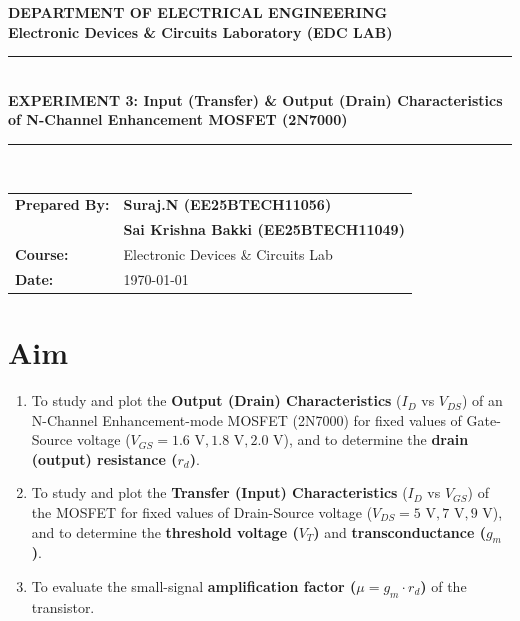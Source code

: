 \documentclass[11pt,a4paper]{article}
\begin{document}
\begin{center}
    {\LARGE \textbf{\color{primary} DEPARTMENT OF ELECTRICAL ENGINEERING}}\\[0.2cm]
    {\large \textbf{Electronic Devices \& Circuits Laboratory (EDC LAB)}}\\[0.4cm]
    \rule{\linewidth}{1pt}\\[0.3cm]
    {\Large \textbf{EXPERIMENT 3: Input (Transfer) \& Output (Drain) Characteristics of N-Channel Enhancement MOSFET (2N7000)}}\\[0.3cm]
    \rule{\linewidth}{1pt}\\[0.4cm]
    
    \begin{tabular}{ll}
      \textbf{Prepared By:} & \textbf{Suraj.N (EE25BTECH11056)} \\
                            & \textbf{Sai Krishna Bakki (EE25BTECH11049)} \\
        \textbf{Course:} & Electronic Devices \& Circuits Lab \\
        \textbf{Date:} & \today
    \end{tabular}
\end{center}

\vspace{0.3cm}

\section{Aim}
\begin{enumerate}
    \item To study and plot the \textbf{Output (Drain) Characteristics} ($I_D$ vs $V_{DS}$) of an N-Channel Enhancement-mode MOSFET (2N7000) for fixed values of Gate-Source voltage ($V_{GS} = 1.6\text{ V}, 1.8\text{ V}, 2.0\text{ V}$), and to determine the \textbf{drain (output) resistance ($r_d$)}.
    \item To study and plot the \textbf{Transfer (Input) Characteristics} ($I_D$ vs $V_{GS}$) of the MOSFET for fixed values of Drain-Source voltage ($V_{DS} = 5\text{ V}, 7\text{ V}, 9\text{ V}$), and to determine the \textbf{threshold voltage ($V_T$)} and \textbf{transconductance ($g_m$)}.
    \item To evaluate the small-signal \textbf{amplification factor ($\mu = g_m \cdot r_d$)} of the transistor.
\end{enumerate}
\end{document}
